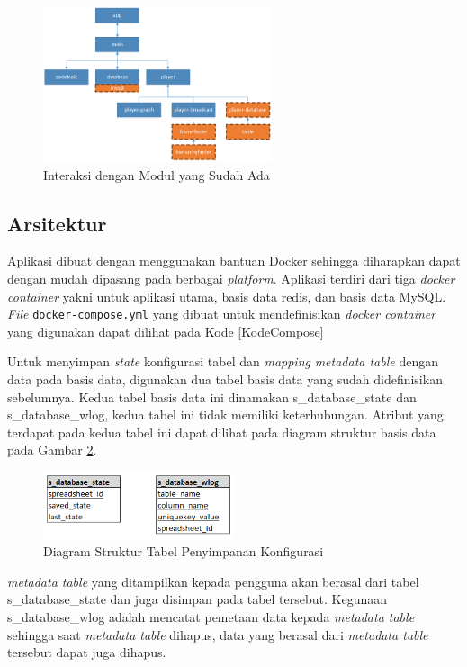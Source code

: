 \begin{figure}[htb]
	\centering
	\includegraphics[width=0.6\textwidth]{resources/chapter-4-module-placing.png}
	\caption{Interaksi dengan Modul yang Sudah Ada}
	\label{ModulePlacing}
\end{figure}

\subsection{Arsitektur}
Aplikasi dibuat dengan menggunakan bantuan Docker sehingga diharapkan dapat dengan mudah dipasang pada berbagai \textit{platform}. Aplikasi terdiri dari tiga \textit{docker container} yakni untuk aplikasi utama, basis data redis, dan basis data MySQL. \textit{File} \texttt{docker-compose.yml} yang dibuat untuk mendefinisikan \textit{docker container} yang digunakan dapat dilihat pada Kode \ref{KodeCompose}

Untuk menyimpan \textit{state} konfigurasi tabel dan \textit{mapping} \textit{metadata table} dengan data pada basis data, digunakan dua tabel basis data yang sudah didefinisikan sebelumnya. Kedua tabel basis data ini dinamakan s\_database\_state dan s\_database\_wlog, kedua tabel ini tidak memiliki keterhubungan. Atribut yang terdapat pada kedua tabel ini dapat dilihat pada diagram struktur basis data pada Gambar \ref{StructureDiagram}.

\begin{figure}[htb]
	\centering
	\includegraphics[width=0.5\textwidth]{resources/chapter-4-architect-db.png}
	\caption{Diagram Struktur Tabel Penyimpanan Konfigurasi}
	\label{StructureDiagram}
\end{figure}

\textit{metadata table} yang ditampilkan kepada pengguna akan berasal dari tabel s\_database\_state dan juga disimpan pada tabel tersebut. Kegunaan  s\_database\_wlog adalah mencatat pemetaan data kepada \textit{metadata table} sehingga saat \textit{metadata table} dihapus, data yang berasal dari \textit{metadata table} tersebut dapat juga dihapus.

